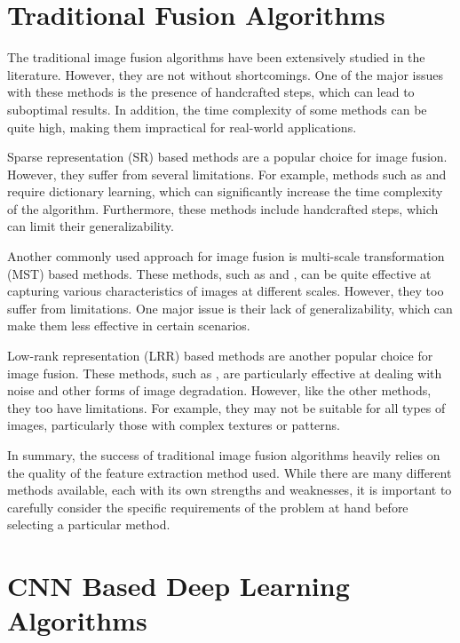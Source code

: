\section{Traditional Fusion Algorithms}

The traditional image fusion algorithms have been extensively studied in the literature. However, they are not without shortcomings. One of the major issues with these methods is the presence of handcrafted steps, which can lead to suboptimal results. In addition, the time complexity of some methods can be quite high, making them impractical for real-world applications.

Sparse representation (SR)\cite{liu2017infrared}  based methods are a popular choice for image fusion. However, they suffer from several limitations. For example, methods such as \cite{bin2016efficient} and \cite{zhang2013dictionary} require dictionary learning, which can significantly increase the time complexity of the algorithm. Furthermore, these methods include handcrafted steps, which can limit their generalizability.

Another commonly used approach for image fusion is multi-scale transformation (MST) based methods. These methods, such as \cite{hu2017adaptive} and \cite{he2017infrared}, can be quite effective at capturing various characteristics of images at different scales. However, they too suffer from limitations. One major issue is their lack of generalizability, which can make them less effective in certain scenarios.

Low-rank representation (LRR) based methods are another popular choice for image fusion. These methods, such as \cite{liu2012robust}, are particularly effective at dealing with noise and other forms of image degradation. However, like the other methods, they too have limitations. For example, they may not be suitable for all types of images, particularly those with complex textures or patterns.

In summary, the success of traditional image fusion algorithms heavily relies on the quality of the feature extraction method used. While there are many different methods available, each with its own strengths and weaknesses, it is important to carefully consider the specific requirements of the problem at hand before selecting a particular method.

\section{CNN Based Deep Learning Algorithms}
\label{sec:CNN}

